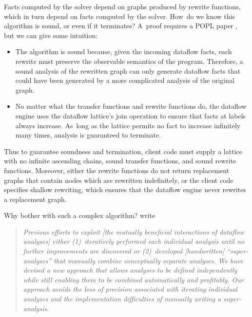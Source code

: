 \documentclass[blockstyle,preprint,natbib,nocopyrightspace]{sigplanconf}
\let\cite\citep
\newcommand{\authornote}[1]{{\em #1}}
\def\authornote#1{\unskip\relax}
\newcommand{\norman}[1]{\authornote{NR: #1}}
\let\remark\norman
\begin{document}
Facts computed by the solver depend on graphs produced by rewrite
functions, which in turn depend on facts computed by the solver.
How~do we know this algorithm is sound, or even if it terminates?
A~proof requires a POPL paper
\cite{lerner-grove-chambers:2002}, but we can give some
intuition:
\begin{itemize} 
\item
The algorithm is sound because, given the incoming dataflow facts,
each rewrite must preserve the observable semantics of the program.
Therefore, a sound analysis of the rewritten graph
can only generate dataflow facts that could have been
generated by a more complicated analysis of the original graph.
\item
No matter what the transfer functions and rewrite functions do,
the dataflow engine uses the dataflow lattice's join operation to ensure that
facts at labels always increase. 
As~long as the lattice permits no fact to increase infinitely many
times, analysis is guaranteed to terminate.
\end{itemize}
Thus to guarantee soundness and termination, client code must supply a
lattice with no infinite ascending chains, sound transfer functions,
and sound rewrite functions.
Moreover, either the rewrite functions do not return replacement graphs that contain
nodes which are rewritten indefinitely,
or the client code specifies shallow rewriting, which ensures that the
dataflow engine never rewrites a replacement graph.

Why bother with such a complex algorithm?
\citet{lerner-grove-chambers:2002} write
\begin{quote}
\emph{Previous efforts to exploit [the mutually beneficial
interactions of dataflow analyses] either (1)~iteratively performed
each individual analysis until no further improvements are discovered
or (2)~developed [handwritten] ``super-analyses'' that manually\remark
{We could condense the quote}
combine conceptually separate analyses. We have devised a new approach
that allows analyses to be defined independently while still enabling
them to be combined automatically and profitably. Our approach avoids
the loss of precision associated with iterating individual analyses
and the implementation difficulties of manually writing a
super-analysis.}
\end{quote}
\end{document}

